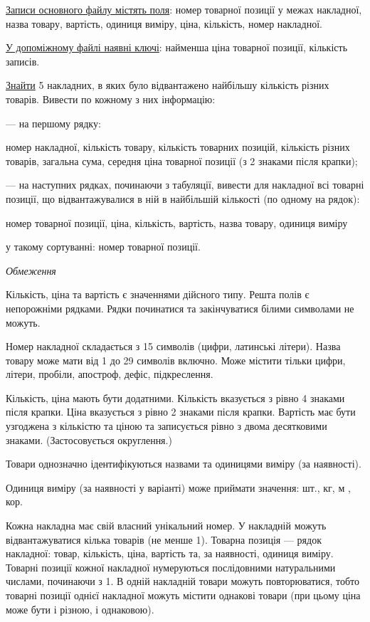 \documentclass[11pt, ukrainian]{article}
\begin{document}
\underline{Записи основного файлу містять поля}: номер товарної позиції у межах накладної, назва товару, вартість, одиниця виміру, ціна, кількість, номер накладної.

\underline{У допоміжному файлі наявні ключі}: найменша ціна товарної позиції, кількість записів.

\underline{Знайти} 5 накладних, в яких було відвантажено найбільшу кількість різних товарів. Вивести по кожному з них інформацію:\par
{\noindent}--- на першому рядку:\par
номер накладної, кількість товару, кількість товарних позицій, кількість різних товарів, загальна сума, середня ціна товарної позиції (з 2 знаками після крапки);

{\noindent}--- на наступних рядках, починаючи з табуляції, вивести для накладної всі товарні позиції, що відвантажувалися в ній в найбільшій кількості (по одному на рядок):\par
номер товарної позиції, ціна, кількість, вартість, назва товару, одиниця виміру

{\noindent}у такому сортуванні: номер товарної позиції.


\bigskip\textit{Обмеження}

Кількість, ціна та вартість є значеннями дійсного типу.
Решта полів є непорожніми рядками.
Рядки починатися та закінчуватися білими символами не можуть.

Номер накладної складається з 15 символів (цифри, латинські літери).
Назва товару може мати від 1 до 29 символів включно.
Може містити тільки цифри, літери, пробіли, апостроф, дефіс, підкреслення.

Кількість, ціна мають бути додатними.
Кількість вказується з рівно 4 знаками після крапки.
Ціна вказується з рівно 2 знаками після крапки.
Вартість має бути узгоджена з кількістю та ціною та записується рівно з двома десятковими знаками.
(Застосовується округлення.)

Товари однозначно ідентифікуються назвами та одиницями виміру (за наявності).

Одиниця виміру (за наявності у варіанті) може приймати значення: шт., кг, м , кор.

Кожна накладна має свій власний унікальний номер.
У накладній можуть відвантажуватися кілька товарів (не менше 1).
Товарна позиція --- рядок накладної: товар, кількість, ціна, вартість та, за наявності, одиниця виміру.
Товарні позиції кожної накладної нумеруються послідовними натуральними числами, починаючи з 1.
В одній накладній товари можуть повторюватися, 
тобто товарні позиції однієї накладної можуть містити однакові товари 
(при цьому ціна може бути і різною, і однаковою).
\end{document}
